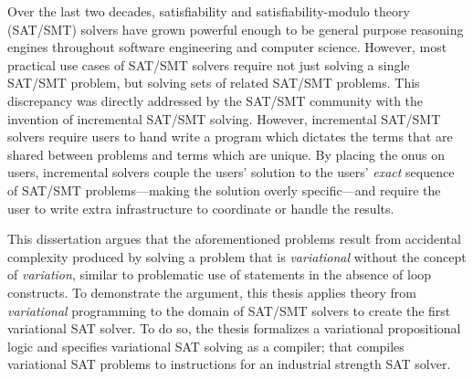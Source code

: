 Over the last two decades, satisfiability and satisfiability-modulo theory
(SAT/SMT) solvers have grown powerful enough to be general purpose reasoning
engines throughout software engineering and computer science. However, most
practical use cases of SAT/SMT solvers require not just solving a single SAT/SMT
problem, but solving sets of related SAT/SMT problems. This discrepancy was
directly addressed by the SAT/SMT community with the invention of incremental
SAT/SMT solving. However, incremental SAT/SMT solvers require users to hand
write a program which dictates the terms that are shared between problems and
terms which are unique. By placing the onus on users, incremental solvers
couple the users' solution to the users' \emph{exact} sequence of
SAT/SMT problems---making the solution overly specific---and require the
user to write extra infrastructure to coordinate or handle the results.

This dissertation argues that the aforementioned problems result from accidental
complexity produced by solving a problem that is \emph{variational} without the
concept of \emph{variation}, similar to problematic use of  statements
in the absence of  loop constructs. To demonstrate the argument, this
thesis applies theory from \emph{variational} programming to the domain of
SAT/SMT solvers to create the first variational SAT solver.
%
To do so, the thesis formalizes a variational propositional logic and specifies
variational SAT solving as a compiler; that compiles variational SAT problems to
instructions for an industrial strength SAT solver.


